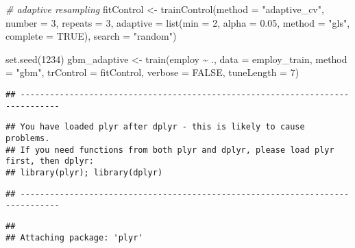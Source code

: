 \documentclass[
]{book}
\newenvironment{Shaded}{\begin{snugshade}}{\end{snugshade}}
\newcommand{\AttributeTok}[1]{\textcolor[rgb]{0.77,0.63,0.00}{#1}}
\newcommand{\CommentTok}[1]{\textcolor[rgb]{0.56,0.35,0.01}{\textit{#1}}}
\newcommand{\ConstantTok}[1]{\textcolor[rgb]{0.00,0.00,0.00}{#1}}
\newcommand{\DecValTok}[1]{\textcolor[rgb]{0.00,0.00,0.81}{#1}}
\newcommand{\FloatTok}[1]{\textcolor[rgb]{0.00,0.00,0.81}{#1}}
\newcommand{\FunctionTok}[1]{\textcolor[rgb]{0.00,0.00,0.00}{#1}}
\newcommand{\NormalTok}[1]{#1}
\newcommand{\OtherTok}[1]{\textcolor[rgb]{0.56,0.35,0.01}{#1}}
\newcommand{\SpecialCharTok}[1]{\textcolor[rgb]{0.00,0.00,0.00}{#1}}
\newcommand{\StringTok}[1]{\textcolor[rgb]{0.31,0.60,0.02}{#1}}
\begin{document}
\begin{Shaded}
\begin{Highlighting}[]
\CommentTok{\# adaptive resampling}
\NormalTok{fitControl }\OtherTok{\textless{}{-}} \FunctionTok{trainControl}\NormalTok{(}\AttributeTok{method =} \StringTok{"adaptive\_cv"}\NormalTok{, }
                           \AttributeTok{number =} \DecValTok{3}\NormalTok{, }\AttributeTok{repeats =} \DecValTok{3}\NormalTok{,}
                           \AttributeTok{adaptive =} \FunctionTok{list}\NormalTok{(}\AttributeTok{min =} \DecValTok{2}\NormalTok{,}
                                           \AttributeTok{alpha =} \FloatTok{0.05}\NormalTok{,}
                                           \AttributeTok{method =} \StringTok{"gls"}\NormalTok{,}
                                           \AttributeTok{complete =} \ConstantTok{TRUE}\NormalTok{),}
                           \AttributeTok{search =} \StringTok{"random"}\NormalTok{)}

\FunctionTok{set.seed}\NormalTok{(}\DecValTok{1234}\NormalTok{)}
\NormalTok{gbm\_adaptive }\OtherTok{\textless{}{-}} \FunctionTok{train}\NormalTok{(employ }\SpecialCharTok{\textasciitilde{}}\NormalTok{ ., }\AttributeTok{data =}\NormalTok{ employ\_train, }
                      \AttributeTok{method =} \StringTok{"gbm"}\NormalTok{, }
                  \AttributeTok{trControl =}\NormalTok{ fitControl,}
                  \AttributeTok{verbose =} \ConstantTok{FALSE}\NormalTok{,}
                  \AttributeTok{tuneLength =} \DecValTok{7}\NormalTok{)}
\end{Highlighting}
\end{Shaded}

\begin{verbatim}
## ------------------------------------------------------------------------------
\end{verbatim}

\begin{verbatim}
## You have loaded plyr after dplyr - this is likely to cause problems.
## If you need functions from both plyr and dplyr, please load plyr first, then dplyr:
## library(plyr); library(dplyr)
\end{verbatim}

\begin{verbatim}
## ------------------------------------------------------------------------------
\end{verbatim}

\begin{verbatim}
## 
## Attaching package: 'plyr'
\end{verbatim}
\end{document}
